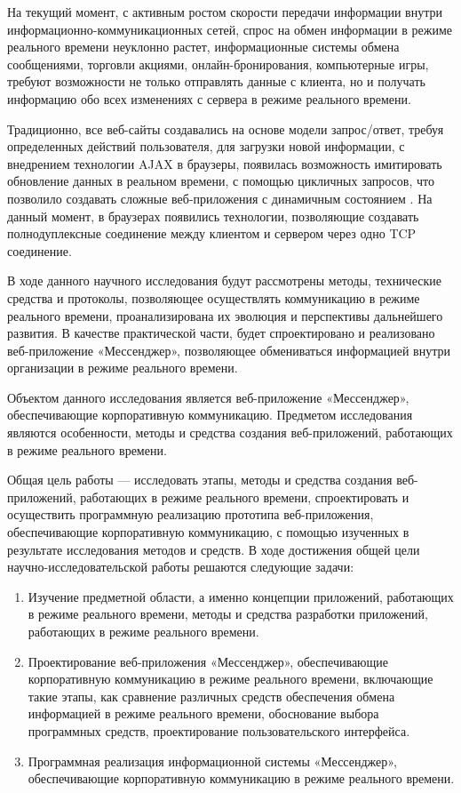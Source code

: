 \intro

На текущий момент, с активным ростом скорости передачи информации внутри информационно-коммуникационных сетей, спрос на обмен информации в режиме реального времени неуклонно растет, информационные системы обмена сообщениями, торговли акциями, онлайн-бронирования, компьютерные игры, требуют возможности не только отправлять данные с клиента, но и получать информацию обо всех изменениях с сервера в режиме реального времени.

Традиционно, все веб-сайты создавались на основе модели запрос/ответ, требуя определенных действий пользователя, для загрузки новой информации, с внедрением технологии AJAX в браузеры, появилась возможность имитировать обновление данных в реальном времени, с помощью цикличных запросов, что позволило создавать сложные веб-приложения с динамичным состоянием \cite{RealtimeWebAppPhp}. На данный момент, в браузерах появились технологии, позволяющие создавать полнодуплексные соединение между клиентом и сервером через одно TCP соединение.

В ходе данного научного исследования будут рассмотрены методы, технические средства и протоколы, позволяющее осуществлять коммуникацию в режиме реального времени, проанализирована их эволюция и перспективы дальнейшего развития.  В качестве практической части, будет спроектировано и реализовано веб-приложение «Мессенджер», позволяющее обмениваться информацией внутри организации в режиме реального времени.

Объектом данного исследования является веб-приложение «Мессенджер», обеспечивающие корпоративную коммуникацию. Предметом исследования являются особенности, методы и средства создания веб-приложений, работающих в режиме реального времени.

Общая цель работы — исследовать этапы, методы и средства создания веб-приложений, работающих в режиме реального времени, спроектировать и осуществить программную реализацию прототипа веб-приложения, обеспечивающие корпоративную коммуникацию, с помощью изученных в результате исследования методов и средств. В ходе достижения общей цели научно-исследовательской работы решаются следующие задачи:

\begin{enumerate} 
  \item Изучение предметной области, а именно концепции приложений, работающих в режиме реального времени, методы и средства разработки приложений, работающих в режиме реального времени.
  
  \item Проектирование веб-приложения «Мессенджер», обеспечивающие корпоративную коммуникацию в режиме реального времени, включающие такие этапы, как сравнение различных средств обеспечения обмена информацией в режиме реального времени, обоснование выбора программных средств, проектирование пользовательского интерфейса.
  
  \item Программная реализация информационной системы «Мессенджер», обеспечивающие корпоративную коммуникацию в режиме реального времени.
\end{enumerate}